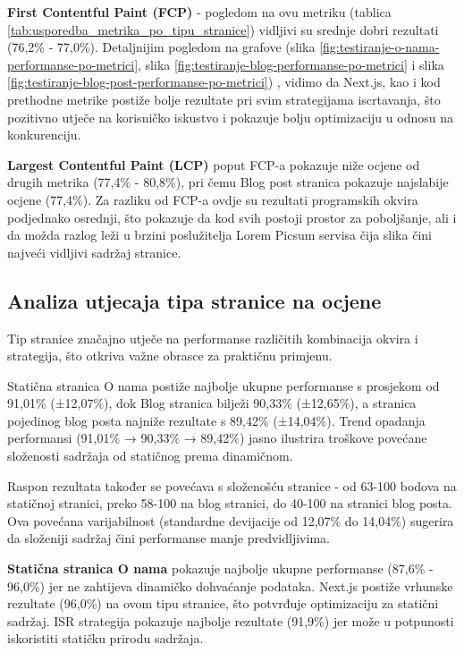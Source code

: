 \textbf{First Contentful Paint (FCP)} - pogledom na ovu metriku (tablica \ref{tab:usporedba_metrika_po_tipu_stranice}) vidljivi su srednje dobri rezultati (76,2\% - 77,0\%). Detaljnijim pogledom na grafove (slika  \ref{fig:testiranje-o-nama-performanse-po-metrici}, slika \ref{fig:testiranje-blog-performanse-po-metrici} i slika \ref{fig:testiranje-blog-post-performanse-po-metrici}) , vidimo da Next.js, kao i kod prethodne metrike postiže bolje rezultate pri svim strategijama iscrtavanja, što pozitivno utječe na korisničko iskustvo i pokazuje bolju optimizaciju u odnosu na konkurenciju.

\textbf{Largest Contentful Paint (LCP)} poput FCP-a pokazuje niže ocjene od drugih metrika (77,4\% - 80,8\%), pri čemu Blog post stranica pokazuje najslabije ocjene (77,4\%). Za razliku od FCP-a ovdje su rezultati programskih okvira podjednako osrednji, što pokazuje da kod svih postoji prostor za poboljšanje, ali i da možda razlog leži u brzini poslužitelja Lorem Picsum servisa čija slika čini najveći vidljivi sadržaj stranice.

\subsection{Analiza utjecaja tipa stranice na ocjene}

Tip stranice značajno utječe na performanse različitih kombinacija okvira i strategija, što otkriva važne obrasce za praktičnu primjenu.

Statična stranica O nama postiže najbolje ukupne performanse s prosjekom od 91,01\% (±12,07\%), dok Blog stranica bilježi 90,33\% (±12,65\%), a stranica pojedinog blog posta najniže rezultate s 89,42\% (±14,04\%). Trend opadanja performansi (91,01\% → 90,33\% → 89,42\%) jasno ilustrira troškove povećane složenosti sadržaja od statičnog prema dinamičnom.

Raspon rezultata također se povećava s složenošću stranice - od 63-100 bodova na statičnoj stranici, preko 58-100 na blog stranici, do 40-100 na stranici blog posta. Ova povećana varijabilnost (standardne devijacije od 12,07\% do 14,04\%) sugerira da složeniji sadržaj čini performanse manje predvidljivima.

\textbf{Statična stranica O nama} pokazuje najbolje ukupne performanse (87,6\% - 96,0\%) jer ne zahtijeva dinamičko dohvaćanje podataka. Next.js postiže vrhunske rezultate (96,0\%) na ovom tipu stranice, što potvrđuje optimizaciju za statični sadržaj. ISR strategija pokazuje najbolje rezultate (91,9\%) jer može u potpunosti iskoristiti statičku prirodu sadržaja.

